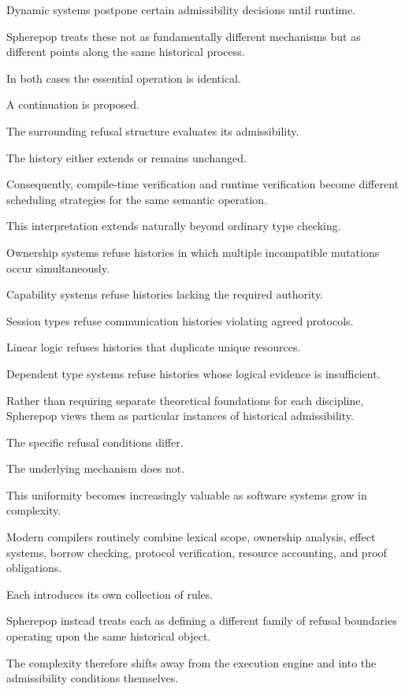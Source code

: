 \documentclass[12pt,oneside]{article}
\theoremstyle{definition}
\theoremstyle{remark}
\begin{document}
Dynamic systems postpone certain admissibility decisions until runtime.

Spherepop treats these not as fundamentally different mechanisms but as
different points along the same historical process.

In both cases the essential operation is identical.

A continuation is proposed.

The surrounding refusal structure evaluates its admissibility.

The history either extends or remains unchanged.

Consequently, compile-time verification and runtime verification become
different scheduling strategies for the same semantic operation.

This interpretation extends naturally beyond ordinary type checking.

Ownership systems refuse histories in which multiple incompatible mutations
occur simultaneously.

Capability systems refuse histories lacking the required authority.

Session types refuse communication histories violating agreed protocols.

Linear logic refuses histories that duplicate unique resources.

Dependent type systems refuse histories whose logical evidence is
insufficient.

Rather than requiring separate theoretical foundations for each discipline,
Spherepop views them as particular instances of historical admissibility.

The specific refusal conditions differ.

The underlying mechanism does not.

This uniformity becomes increasingly valuable as software systems grow in
complexity.

Modern compilers routinely combine lexical scope, ownership analysis, effect
systems, borrow checking, protocol verification, resource accounting, and
proof obligations.

Each introduces its own collection of rules.

Spherepop instead treats each as defining a different family of refusal
boundaries operating upon the same historical object.

The complexity therefore shifts away from the execution engine and into the
admissibility conditions themselves.
\end{document}
